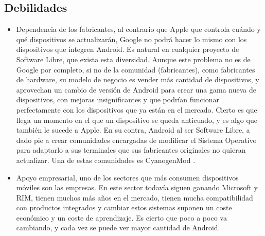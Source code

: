 \documentclass[11pt]{article}
\begin{document}
\subsection{Debilidades}
\begin{itemize}
\item Dependencia de los fabricantes, al contrario que Apple que controla cuándo y qué dispositivos se actualizarán, Google no podrá hacer lo mismo con los dispositivos que integren Android. Es natural en cualquier proyecto de Software Libre, que exista esta diversidad. Aunque este problema no es de Google por completo, si no de la comunidad (fabricantes), como fabricantes de hardware, su modelo de negocio es vender más cantidad de dispositivos, y aprovechan un cambio de versión de Android para crear una gama nueva de dispositivos, con mejoras insignificantes y que podrían funcionar perfectamente con los dispositivos que ya están en el mercado. Cierto es que llega un momento en el que un dispositivo se queda anticuado, y es algo que también le sucede a Apple. En su contra, Android al ser Software Libre, a dado pie a crear comunidades encargadas de modificar el Sistema Operativo para adaptarlo a sus terminales que sus fabricantes originales no quieran actualizar. Una de estas comunidades es CyanogenMod \cite{cyanogenmod}.
\item Apoyo empresarial, uno de los sectores que más consumen dispositivos móviles son las empresas. En este sector todavía siguen ganando Microsoft y RIM, tienen muchos más años en el mercado, tienen mucha compatibilidad con productos integrados y cambiar estos sistemas suponen un coste económico y un coste de aprendizaje. Es cierto que poco a poco va cambiando, y cada vez se puede ver mayor cantidad de Android.
\end{itemize}
\end{document}
